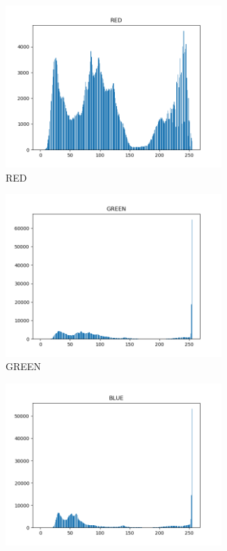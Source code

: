 \documentclass[11pt]{report}
\begin{document}
\begin{figure}[H]
    \centering
    \begin{subfigure}{0.4\textwidth}
        \centering
        \includegraphics[width=0.9\textwidth]{Task 1 Plots/histogram_RED.png}
        \caption{RED}
        \label{fig:red_hist}
    \end{subfigure}
    \begin{subfigure}{0.4\textwidth}
        \centering
        \includegraphics[width=0.9\textwidth]{Task 1 Plots/histogram_GREEN.png}
        \caption{GREEN}
        \label{fig:green_hist}
    \end{subfigure}
    \begin{subfigure}{0.4\textwidth}
        \centering
        \includegraphics[width=0.9\textwidth]{Task 1 Plots/histogram_BLUE.png}

\end{subfigure}
\end{figure}
\end{document}
